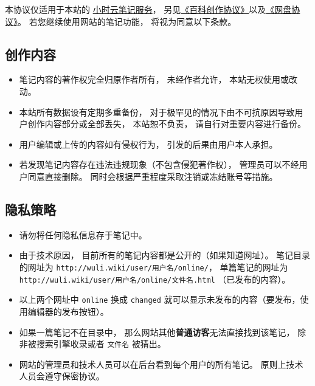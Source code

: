 
本协议仅适用于本站的 \href{http://wuli.wiki/note/}{小时云笔记服务}， 另见\href{http://wuli.wiki/online/licens.html}{《百科创作协议》}以及\href{http://www.example.com}{《网盘协议》}。 若您继续使用网站的笔记功能， 将视为同意以下条款。

\subsection{创作内容}
\begin{itemize}
\item 笔记内容的著作权完全归原作者所有， 未经作者允许， 本站无权使用或改动。
\item 本站所有数据设有定期多重备份， 对于极罕见的情况下由不可抗原因导致用户创作内容部分或全部丢失， 本站恕不负责， 请自行对重要内容进行备份。
\item 用户编辑或上传的内容如有侵权行为， 引发的后果由用户本人承担。
\item 若发现笔记内容存在违法违规现象（不包含侵犯著作权）， 管理员可以不经用户同意直接删除。 同时会根据严重程度采取注销或冻结账号等措施。
\end{itemize}

\subsection{隐私策略}
\begin{itemize}
\item 请勿将任何隐私信息存于笔记中。
\item 由于技术原因， 目前所有的笔记内容都是公开的（如果知道网址）。 笔记目录的网址为 \verb`http://wuli.wiki/user/用户名/online/`， 单篇笔记的网址为 \verb`http://wuli.wiki/user/用户名/online/文件名.html` （已发布的内容）。
\item 以上两个网址中 \verb`online` 换成 \verb`changed` 就可以显示未发布的内容（要发布，使用编辑器的发布按钮）。
\item 如果一篇笔记不在目录中， 那么网站其他\textbf{普通访客}无法直接找到该笔记， 除非被搜索引擎收录或者 \verb`文件名` 被猜出。
\item 网站的管理员和技术人员可以在后台看到每个用户的所有笔记。 原则上技术人员会遵守保密协议。
\end{itemize}
